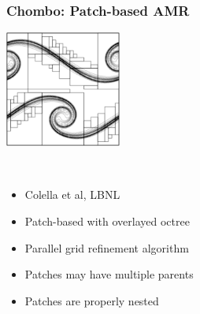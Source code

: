 \begin{frame}[fragile] \frametitle{Chombo: Patch-based AMR}
\begin{minipage}{1.5in}
\centerline{\includegraphics[width=1.5in]{chombo.png}}
\end{minipage} \ 
\begin{minipage}{2.5in}
\begin{itemize}
\item Colella et al, LBNL
\item Patch-based with overlayed octree
\item Parallel grid refinement algorithm
\item Patches may have multiple parents
\item Patches are properly nested
\end{itemize}
\end{minipage}
\end{frame}
